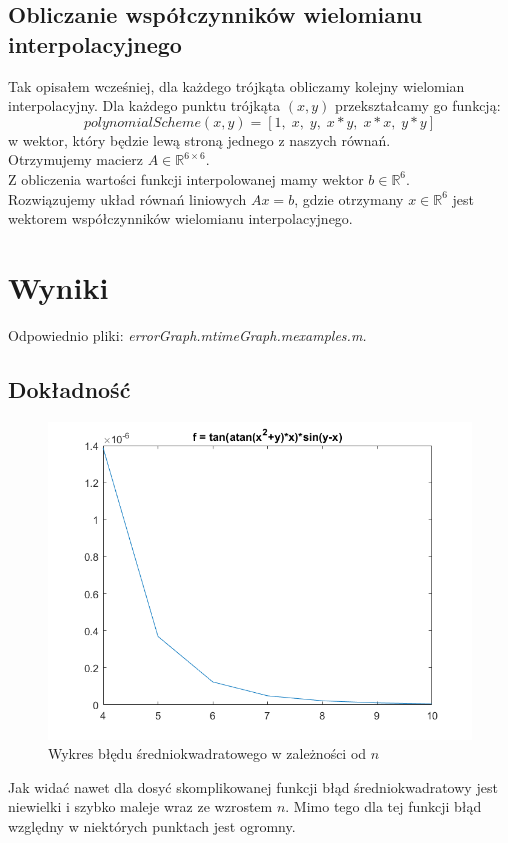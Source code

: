 \documentclass[12pt, leqno]{article}
\begin{document}
            \subsection*{Obliczanie współczynników wielomianu interpolacyjnego}
            Tak opisałem wcześniej, dla każdego trójkąta obliczamy kolejny wielomian interpolacyjny.
            Dla każdego punktu trójkąta $(x,y)$ przekształcamy go funkcją: 
            \[ polynomialScheme(x,y) = [1,\; x,\; y,\; x*y,\; x*x,\; y*y] \]
            w wektor, który będzie lewą stroną jednego z naszych równań.\\
            Otrzymujemy macierz $A \in \mathbb{R}^{6 \times 6}$.\\
            Z obliczenia wartości funkcji interpolowanej mamy wektor $b \in \mathbb{R}^{6}$.\\
            Rozwiązujemy układ równań liniowych $Ax = b$, gdzie otrzymany $x\in \mathbb{R}^{6}$ jest
            wektorem współczynników wielomianu interpolacyjnego.
    \section{Wyniki} 
        \vspace{-1mm}
        Odpowiednio pliki: \textit{errorGraph.m\quad timeGraph.m\quad examples.m.}
        \vspace{-2mm}
        \subsection*{Dokładność}
        \begin{figure}[!h]
            \includegraphics[width=\linewidth]{graph.png}
            \caption{Wykres błędu średniokwadratowego w zależności od $n$}
        \end{figure}
        Jak widać nawet dla dosyć skomplikowanej funkcji błąd średniokwadratowy jest niewielki i szybko
        maleje wraz ze wzrostem $n$. Mimo tego dla tej funkcji błąd względny w niektórych punktach jest
        ogromny.
\end{document}
